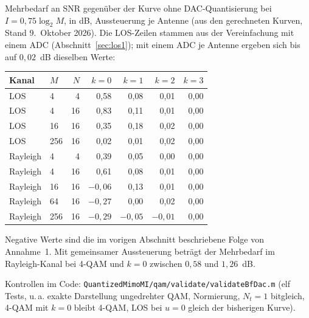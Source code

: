 \documentclass[11pt,a4paper]{article}
\newcommand{\file}[1]{\texttt{#1}}
\begin{document}
Mehrbedarf an SNR gegenüber der Kurve ohne DAC-Quantisierung bei $I=0{,}75\log_2M$, in dB,
Aussteuerung je Antenne (aus den gerechneten Kurven, Stand 9.~Oktober 2026). Die LOS-Zeilen
stammen aus der Vereinfachung mit einem ADC (Abschnitt~\ref{sec:los1}); mit einem ADC je
Antenne ergeben sich bis auf $0{,}02$~dB dieselben Werte:

\begin{center}
\begin{tabular}{llrrrrr}
\toprule
Kanal & $M$ & $N$ & $k=0$ & $k=1$ & $k=2$ & $k=3$\\
\midrule
LOS & 4 & 4 & 0{,}58 & 0{,}08 & 0{,}01 & 0{,}00\\
LOS & 4 & 16 & 0{,}83 & 0{,}11 & 0{,}01 & 0{,}00\\
LOS & 16 & 16 & 0{,}35 & 0{,}18 & 0{,}02 & 0{,}00\\
LOS & 256 & 16 & 0{,}02 & 0{,}01 & 0{,}02 & 0{,}00\\
\midrule
Rayleigh & 4 & 4 & 0{,}39 & 0{,}05 & 0{,}00 & 0{,}00\\
Rayleigh & 4 & 16 & 0{,}61 & 0{,}08 & 0{,}01 & 0{,}00\\
Rayleigh & 16 & 16 & $-0{,}06$ & 0{,}13 & 0{,}01 & 0{,}00\\
Rayleigh & 64 & 16 & $-0{,}27$ & 0{,}00 & 0{,}02 & 0{,}00\\
Rayleigh & 256 & 16 & $-0{,}29$ & $-0{,}05$ & $-0{,}01$ & 0{,}00\\
\bottomrule
\end{tabular}
\end{center}

Negative Werte sind die im vorigen Abschnitt beschriebene Folge von Annahme~1. Mit gemeinsamer
Aussteuerung beträgt der Mehrbedarf im Rayleigh-Kanal bei 4-QAM und $k=0$ zwischen $0{,}58$ und
$1{,}26$~dB.

{\color{note}\small Kontrollen im Code: \file{QuantizedMimoMI/qam/validate/validateBfDac.m} (elf
Tests, u.\,a. exakte Darstellung ungedrehter QAM, Normierung, $N_t=1$ bitgleich, 4-QAM mit $k=0$
bleibt 4-QAM, LOS bei $u=0$ gleich der bisherigen Kurve).}
\end{document}

